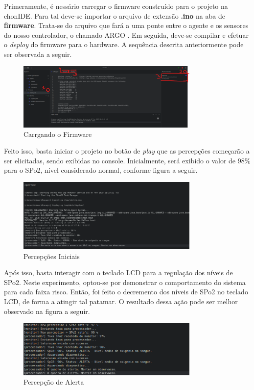 Primeramente, é nessário carregar o firmware construído para o projeto na chonIDE. Para tal deve-se importar o arquivo de extensão \textbf{.ino} na aba de \textbf{firmware}. Trata-se do arquivo que fará a uma ponte entre o agente e os sensores do nosso controlador, o chamado ARGO \cite{inproceedings}. Em seguida, deve-se compilar e efetuar o \textit{deploy} do firmware para o hardware. A sequência descrita anteriormente pode ser observada a seguir.

\begin{figure}[H]
  \centering
  \includegraphics[width=0.8\textwidth]{assets/img/steps.png}
  \caption{Carrgando o Firmware}
  \label{fig:circuit}
\end{figure}

Feito isso, basta iniciar o projeto no botão de \textit{play} que as percepções começarão a ser elicitadas, sendo exibidas no console. Inicialmente, será exibido o valor de 98\% para o SPo2, nível considerado normal,  conforme figura a seguir.

\begin{figure}[H]
  \centering
  \includegraphics[width=0.8\textwidth]{assets/img/perceptions.png}
  \caption{Percepções Iniciais}
  \label{fig:circuit}
\end{figure}

Após isso, basta interagir com o teclado LCD para a regulação dos níveis de SPo2. Neste experimento, optou-se por demonstrar o comportamento do sistema para cada faixa risco. Então, foi feito o decremento dos níveis de SPo2 no teclado LCD, de forma a atingir tal patamar. O resultado dessa ação pode ser melhor observado na figura a seguir.

\begin{figure}[H]
  \centering
  \includegraphics[width=0.8\textwidth]{assets/img/perception.alert.png}
  \caption{Percepção de Alerta}
  \label{fig:circuit}
\end{figure}

